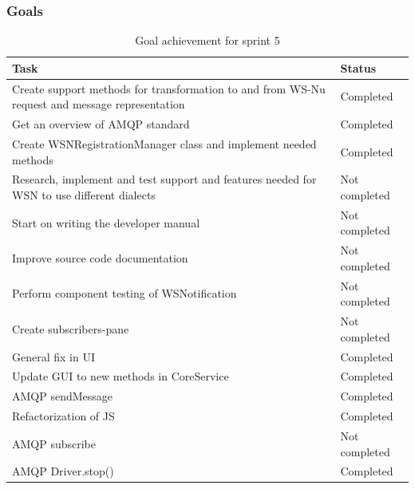 \subsubsection{Goals}
\label{subsec:project_lifecycle-development-sprint_5-goals}

\begin{table}[ht!]
\small
\centering
\begin{tabular}{ | p{10cm} | p{2cm} |}
\hline
 \rowcolor{lightgray}
 \textbf{Task} & \textbf{Status} \\
\hline
\rowcolor{green!30}
Create support methods for transformation to and from WS-Nu request and message representation & Completed \\
\rowcolor{green!30}
Get an overview of AMQP standard & Completed \\
\rowcolor{green!30}
Create WSNRegistrationManager class and implement needed methods & Completed \\
\rowcolor{orange!40}
Research, implement and test support and features needed for WSN to use different dialects	& Not completed \\
\rowcolor{orange!40}
Start on writing the developer manual & Not completed \\
\rowcolor{orange!40}
Improve source code documentation & Not completed \\
\rowcolor{orange!40}
Perform component testing of WSNotification	& Not completed \\
\rowcolor{orange!40}
Create subscribers-pane	& Not completed \\
\rowcolor{green!30}
General fix in UI & Completed \\
\rowcolor{green!30}
Update GUI to new methods in CoreService & Completed \\
\rowcolor{green!30}
AMQP sendMessage & Completed \\
\rowcolor{green!30}
Refactorization of JS & Completed \\
\rowcolor{orange!40}
AMQP subscribe & Not completed \\
\rowcolor{green!30}
AMQP Driver.stop() & Completed \\
\hline
\end{tabular}
\caption{Goal achievement for sprint 5}
\label{tab:sprint 5, goals}
\end{table}

